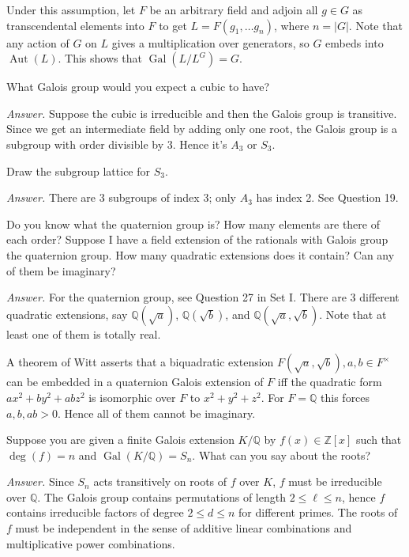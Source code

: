 \documentclass{mathproblems}
\newcommand\Q{\mathbb{Q}}
\newcommand\Z{\mathbb{Z}}
\DeclareMathOperator{\Aut}{Aut}
\DeclareMathOperator{\Gal}{Gal}
\begin{document}
\begin{questions}
Under this assumption, let $F$ be an arbitrary field and adjoin all $g\in G$ as transcendental elements into $F$ to get $L=F(g_1,\ldots g_n)$, where $n=|G|$. Note that any action of $G$ on $L$ gives a multiplication over generators, so $G$ embeds into $\Aut(L)$. This shows that $\Gal(L/L^G)=G$.

\miquestion
{\color{blue} What Galois group would you expect a cubic to have?}

\textit{Answer.}
Suppose the cubic is irreducible and then the Galois group is transitive. Since we get an intermediate field by adding only one root, the Galois group is a subgroup with order divisible by 3. Hence it's $A_3$ or $S_3$.

\miquestion
{\color{blue} Draw the subgroup lattice for $S_{3}$.}

\textit{Answer.} There are 3 subgroups of index 3; only $A_3$ has index 2. See Question 19.

\miquestion
{\color{blue} Do you know what the quaternion group is? How many elements are there of each order? Suppose I have a field extension of the rationals with Galois group the quaternion group. How many quadratic extensions does it contain? Can any of them be imaginary?}

\textit{Answer.} For the quaternion group, see Question 27 in Set I. There are 3 different quadratic extensions, say $\Q(\sqrt{a})$, $\Q(\sqrt{b})$, and $\Q(\sqrt{a},\sqrt{b})$. Note that at least one of them is totally real.

A theorem of Witt asserts that a biquadratic extension $F(\sqrt{a}, \sqrt{b}), a, b \in F^{\times}$ can be embedded in a quaternion Galois extension of $F$ iff the quadratic form $a x^{2}+b y^{2}+a b z^{2}$ is isomorphic over $F$ to $x^{2}+y^{2}+z^{2}$. For $F=\mathbb{Q}$ this forces $a, b, a b>0$. Hence all of them cannot be imaginary.

\miquestion
{\color{blue} Suppose you are given a finite Galois extension $K / \Q$ by $f(x) \in \Z[x]$ such that $\operatorname{deg}(f)=n$ and $\Gal(K / \Q)=S_{n}$. What can you say about the roots?}

\textit{Answer.} Since $S_n$ acts transitively on roots of $f$ over $K$, $f$ must be irreducible over $\Q$. The Galois group contains permutations of length $2\leq \ell\leq n$, hence $f$ contains irreducible factors of degree $2\leq d\leq n$ for different primes. The roots of $f$ must be independent in the sense of additive linear combinations and multiplicative power combinations.


\end{questions}
\end{document}
